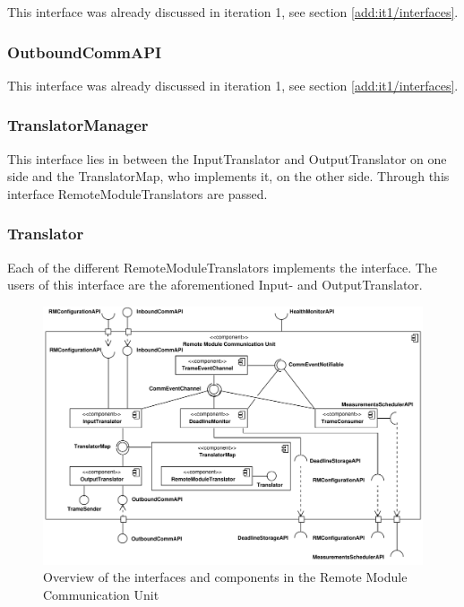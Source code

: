 \npar This interface was already discussed in iteration 1, see section
\ref{add:it1/interfaces}.

\subsubsection{OutboundCommAPI}

\npar This interface was already discussed in iteration 1, see section
\ref{add:it1/interfaces}.

\subsubsection{TranslatorManager}

\npar This interface lies in between the InputTranslator and OutputTranslator
on one side and the TranslatorMap, who implements it, on the other side.
Through this interface RemoteModuleTranslators are passed.

\subsubsection{Translator}

\npar Each of the different RemoteModuleTranslators implements the
 interface. The users of this interface are the
aforementioned Input- and OutputTranslator.

\begin{figure}[H]
	\begin{centering}
		\includegraphics[width=\textwidth]{figs/add-it2-interfaces.pdf}
		\caption{Overview of the interfaces and components in the Remote
		Module Communication Unit}
		\label{fig:it2/interfaces}
	\end{centering}
\end{figure}


